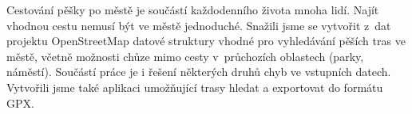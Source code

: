 Cestování pěšky po městě je součástí každodenního života mnoha lidí. Najít
vhodnou cestu nemusí být ve městě jednoduché. Snažili jsme se vytvořit z~dat
projektu OpenStreetMap datové struktury vhodné pro vyhledávání pěších tras ve
městě, včetně možnosti chůze mimo cesty v~průchozích oblastech (parky, náměstí). 
Součástí práce je i řešení některých druhů chyb ve vstupních datech. Vytvořili
jsme také aplikaci umožňující trasy hledat a exportovat do formátu GPX.

